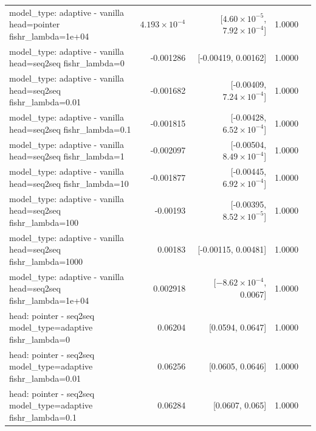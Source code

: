 \documentclass[10pt]{article}
\makeatletter
\newcommand{\stackcell}[1]{\begin{tabular}[t]{@{}l@{}}#1\end{tabular}}
\makeatother
\begin{document}
{\begin{longtable}{lrrrl}
\stackcell{model\_type: adaptive - vanilla\\\footnotesize head=pointer fishr\_lambda=1e+04 } & $4.193\times10^{-4}$ & [$4.60\times10^{-5}$, $7.92\times10^{-4}$] & 1.0000 & \\
\stackcell{model\_type: adaptive - vanilla\\\footnotesize head=seq2seq fishr\_lambda=0 } & -0.001286 & [-0.00419, 0.00162] & 1.0000 & \\
\stackcell{model\_type: adaptive - vanilla\\\footnotesize head=seq2seq fishr\_lambda=0.01 } & -0.001682 & [-0.00409, $7.24\times10^{-4}$] & 1.0000 & \\
\stackcell{model\_type: adaptive - vanilla\\\footnotesize head=seq2seq fishr\_lambda=0.1 } & -0.001815 & [-0.00428, $6.52\times10^{-4}$] & 1.0000 & \\
\stackcell{model\_type: adaptive - vanilla\\\footnotesize head=seq2seq fishr\_lambda=1 } & -0.002097 & [-0.00504, $8.49\times10^{-4}$] & 1.0000 & \\
\stackcell{model\_type: adaptive - vanilla\\\footnotesize head=seq2seq fishr\_lambda=10 } & -0.001877 & [-0.00445, $6.92\times10^{-4}$] & 1.0000 & \\
\stackcell{model\_type: adaptive - vanilla\\\footnotesize head=seq2seq fishr\_lambda=100 } & -0.00193 & [-0.00395, $8.52\times10^{-5}$] & 1.0000 & \\
\stackcell{model\_type: adaptive - vanilla\\\footnotesize head=seq2seq fishr\_lambda=1000 } & 0.00183 & [-0.00115, 0.00481] & 1.0000 & \\
\stackcell{model\_type: adaptive - vanilla\\\footnotesize head=seq2seq fishr\_lambda=1e+04 } & 0.002918 & [$-8.62\times10^{-4}$, 0.0067] & 1.0000 & \\
\stackcell{head: pointer - seq2seq\\\footnotesize model\_type=adaptive fishr\_lambda=0 } & 0.06204 & [0.0594, 0.0647] & 1.0000 & \\
\stackcell{head: pointer - seq2seq\\\footnotesize model\_type=adaptive fishr\_lambda=0.01 } & 0.06256 & [0.0605, 0.0646] & 1.0000 & \\
\stackcell{head: pointer - seq2seq\\\footnotesize model\_type=adaptive fishr\_lambda=0.1 } & 0.06284 & [0.0607, 0.065] & 1.0000 & \\

\end{longtable}}
\end{document}
